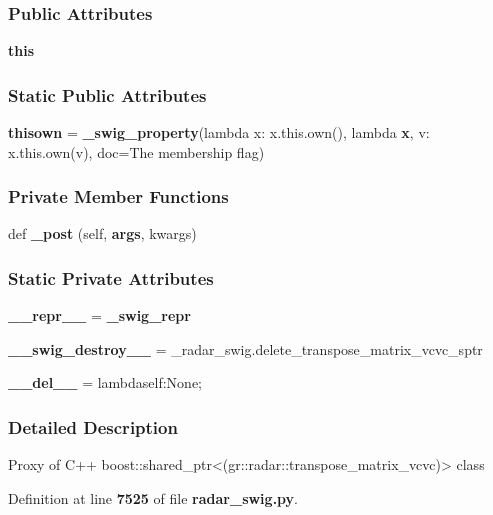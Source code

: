 \subsubsection*{Public Attributes}
\begin{DoxyCompactItemize}
\item 
{\bf this}
\end{DoxyCompactItemize}
\subsubsection*{Static Public Attributes}
\begin{DoxyCompactItemize}
\item 
{\bf thisown} = {\bf \+\_\+swig\+\_\+property}(lambda x\+: x.\+this.\+own(), lambda {\bf x}, v\+: x.\+this.\+own(v), doc=\textquotesingle{}The membership flag\textquotesingle{})
\end{DoxyCompactItemize}
\subsubsection*{Private Member Functions}
\begin{DoxyCompactItemize}
\item 
def {\bf \+\_\+post} (self, {\bf args}, kwargs)
\end{DoxyCompactItemize}
\subsubsection*{Static Private Attributes}
\begin{DoxyCompactItemize}
\item 
{\bf \+\_\+\+\_\+repr\+\_\+\+\_\+} = {\bf \+\_\+swig\+\_\+repr}
\item 
{\bf \+\_\+\+\_\+swig\+\_\+destroy\+\_\+\+\_\+} = \+\_\+radar\+\_\+swig.\+delete\+\_\+transpose\+\_\+matrix\+\_\+vcvc\+\_\+sptr
\item 
{\bf \+\_\+\+\_\+del\+\_\+\+\_\+} = lambdaself\+:\+None;
\end{DoxyCompactItemize}


\subsubsection{Detailed Description}
\begin{DoxyVerb}Proxy of C++ boost::shared_ptr<(gr::radar::transpose_matrix_vcvc)> class\end{DoxyVerb}
 

Definition at line {\bf 7525} of file {\bf radar\+\_\+swig.\+py}.



